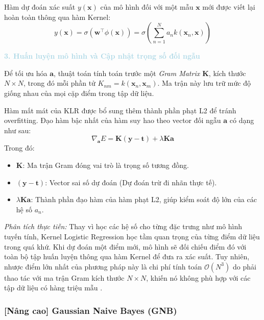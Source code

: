 Hàm dự đoán xác suất $y(\mathbf{x})$ của mô hình đối với một mẫu $\mathbf{x}$ mới được viết lại hoàn toàn thông qua hàm Kernel:
\begin{equation}
    y(\mathbf{x}) = \sigma(\mathbf{w}^\top \phi(\mathbf{x})) = \sigma \left( \sum_{n=1}^N a_n k(\mathbf{x}_n, \mathbf{x}) \right)
\end{equation}

\vspace{0.5em}
\noindent\textcolor{lightblue}{\textbf{3. Huấn luyện mô hình và Cập nhật trọng số đối ngẫu}}
\vspace{0.5em}

Để tối ưu hóa $\mathbf{a}$, thuật toán tính toán trước một \textit{Gram Matrix $\mathbf{K}$}, kích thước $N \times N$, trong đó mỗi phần tử $K_{nm} = k(\mathbf{x}_n, \mathbf{x}_m)$. Ma trận này lưu trữ mức độ giống nhau của mọi cặp điểm trong tập dữ liệu.

Hàm mất mát của KLR được bổ sung thêm thành phần phạt L2 để tránh overfitting. Đạo hàm bậc nhất của hàm suy hao theo vector đối ngẫu $\mathbf{a}$ có dạng như sau:
\begin{equation}
    \nabla_{\mathbf{a}} E = \mathbf{K}(\mathbf{y} - \mathbf{t}) + \lambda \mathbf{K} \mathbf{a}
\end{equation}
Trong đó:
\begin{itemize}
    \item $\mathbf{K}$: Ma trận Gram đóng vai trò là trọng số tương đồng.
    \item $(\mathbf{y} - \mathbf{t})$: Vector sai số dự đoán (Dự đoán trừ đi nhãn thực tế).
    \item $\lambda \mathbf{K} \mathbf{a}$: Thành phần đạo hàm của hàm phạt L2, giúp kiểm soát độ lớn của các hệ số $a_n$.
\end{itemize}

\textit{Phân tích thực tiễn:} Thay vì học các hệ số cho từng đặc trưng như mô hình tuyến tính, Kernel Logistic Regression học tầm quan trọng của từng điểm dữ liệu trong quá khứ. Khi dự đoán một điểm mới, mô hình sẽ đối chiếu điểm đó với toàn bộ tập huấn luyện thông qua hàm Kernel để đưa ra xác suất. Tuy nhiên, nhược điểm lớn nhất của phương pháp này là chi phí tính toán $\mathcal{O}(N^3)$ do phải thao tác với ma trận Gram kích thước $N \times N$, khiến nó không phù hợp với các tập dữ liệu có hàng triệu mẫu \cite{mohri2018foundations}.

\subsubsection{[Nâng cao] Gaussian Naive Bayes (GNB)}


